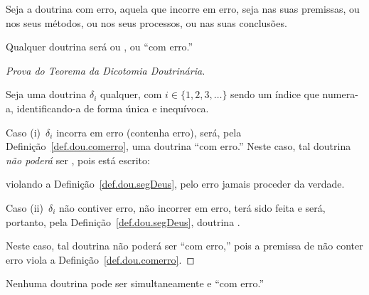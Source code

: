     \begin{DEF}
        \label{def.dou.comerro}
        Seja a doutrina com erro, aquela que incorre em erro, seja nas suas premissas, ou nos seus métodos,  ou  nos
        seus processos, ou nas suas conclusões.
    \end{DEF}

    \begin{THE}
        \label{the.dou.dicotomia}
        Qualquer doutrina será ou , ou ``com erro.''
    \end{THE}

    \begin{proof}[Prova do Teorema da Dicotomia Doutrinária]
        \label{pro.the.dicotomia}

        Seja uma doutrina $\delta_i$ qualquer, com $i \in \{1,  2,  3,  \ldots\}$  sendo  um  índice  que  numera-a,
        identificando-a de forma única e inequívoca.

        Caso (i)~$\delta_i$ incorra  em  erro  (contenha  erro),  será,  pela  Definição~\ref{def.dou.comerro},  uma
        doutrina ``com erro.'' Neste caso, tal doutrina \emph{não  poderá}  ser  ,  pois  está
        escrito:


        \noindent violando a Definição~\ref{def.dou.segDeus}, pelo erro jamais proceder da verdade.

        Caso (ii)~$\delta_i$ não contiver erro, não incorrer em erro, terá sido feita     e     será,     portanto,     pela
        Definição~\ref{def.dou.segDeus}, doutrina .

        Neste caso, tal doutrina não poderá  ser  ``com  erro,''  pois  a  premissa  de  não  conter  erro  viola  a
        Definição~\ref{def.dou.comerro}.

    \end{proof}

    \begin{COR}
        \label{cor.dicotomia.1}
        Nenhuma doutrina pode ser simultaneamente  e ``com erro.''
    \end{COR}

